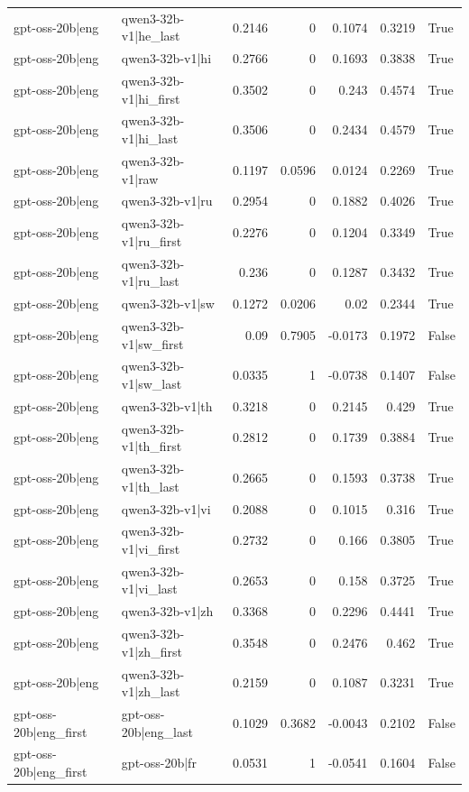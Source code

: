 \begin{table}
\begin{tabular}{l l r r r r l}
gpt-oss-20b|eng & qwen3-32b-v1|he_last & 0.2146 & 0 & 0.1074 & 0.3219 & True \\
gpt-oss-20b|eng & qwen3-32b-v1|hi & 0.2766 & 0 & 0.1693 & 0.3838 & True \\
gpt-oss-20b|eng & qwen3-32b-v1|hi_first & 0.3502 & 0 & 0.243 & 0.4574 & True \\
gpt-oss-20b|eng & qwen3-32b-v1|hi_last & 0.3506 & 0 & 0.2434 & 0.4579 & True \\
gpt-oss-20b|eng & qwen3-32b-v1|raw & 0.1197 & 0.0596 & 0.0124 & 0.2269 & True \\
gpt-oss-20b|eng & qwen3-32b-v1|ru & 0.2954 & 0 & 0.1882 & 0.4026 & True \\
gpt-oss-20b|eng & qwen3-32b-v1|ru_first & 0.2276 & 0 & 0.1204 & 0.3349 & True \\
gpt-oss-20b|eng & qwen3-32b-v1|ru_last & 0.236 & 0 & 0.1287 & 0.3432 & True \\
gpt-oss-20b|eng & qwen3-32b-v1|sw & 0.1272 & 0.0206 & 0.02 & 0.2344 & True \\
gpt-oss-20b|eng & qwen3-32b-v1|sw_first & 0.09 & 0.7905 & -0.0173 & 0.1972 & False \\
gpt-oss-20b|eng & qwen3-32b-v1|sw_last & 0.0335 & 1 & -0.0738 & 0.1407 & False \\
gpt-oss-20b|eng & qwen3-32b-v1|th & 0.3218 & 0 & 0.2145 & 0.429 & True \\
gpt-oss-20b|eng & qwen3-32b-v1|th_first & 0.2812 & 0 & 0.1739 & 0.3884 & True \\
gpt-oss-20b|eng & qwen3-32b-v1|th_last & 0.2665 & 0 & 0.1593 & 0.3738 & True \\
gpt-oss-20b|eng & qwen3-32b-v1|vi & 0.2088 & 0 & 0.1015 & 0.316 & True \\
gpt-oss-20b|eng & qwen3-32b-v1|vi_first & 0.2732 & 0 & 0.166 & 0.3805 & True \\
gpt-oss-20b|eng & qwen3-32b-v1|vi_last & 0.2653 & 0 & 0.158 & 0.3725 & True \\
gpt-oss-20b|eng & qwen3-32b-v1|zh & 0.3368 & 0 & 0.2296 & 0.4441 & True \\
gpt-oss-20b|eng & qwen3-32b-v1|zh_first & 0.3548 & 0 & 0.2476 & 0.462 & True \\
gpt-oss-20b|eng & qwen3-32b-v1|zh_last & 0.2159 & 0 & 0.1087 & 0.3231 & True \\
gpt-oss-20b|eng_first & gpt-oss-20b|eng_last & 0.1029 & 0.3682 & -0.0043 & 0.2102 & False \\
gpt-oss-20b|eng_first & gpt-oss-20b|fr & 0.0531 & 1 & -0.0541 & 0.1604 & False \\

\end{tabular}
\end{table}
